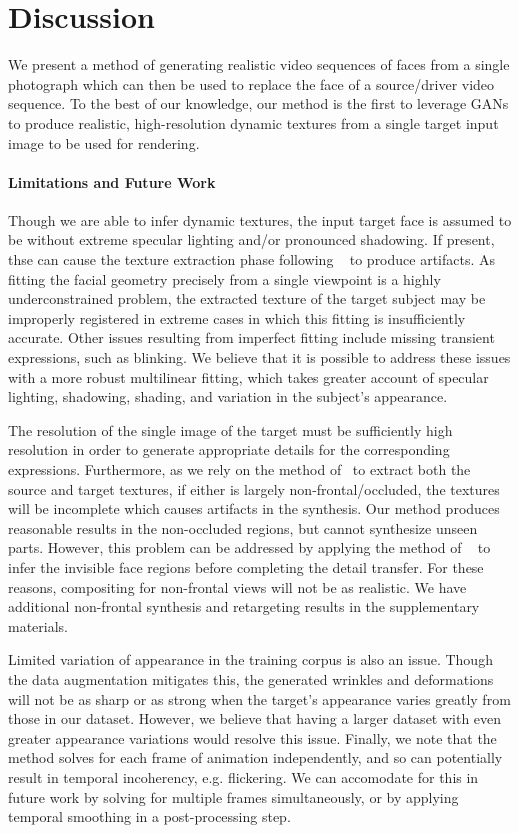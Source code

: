 
\section{Discussion}

We present a method of generating realistic video sequences of faces from a single photograph 
which can then be used to replace the face of a source/driver video sequence. 
To the best of our knowledge, our method is the first
to leverage GANs to produce realistic, high-resolution dynamic textures from a single target input image to be used for rendering.  

\paragraph{Limitations and Future Work}
Though we are able to infer dynamic textures, the input target face is assumed to be without extreme specular lighting and/or pronounced shadowing. If present, thse can cause the texture extraction phase following ~\cite{f2f} to produce artifacts. As fitting the facial geometry precisely from a single viewpoint is a highly underconstrained problem, the extracted texture of the target subject may be improperly registered in extreme cases in which this fitting is insufficiently accurate. Other issues resulting from imperfect fitting include missing transient expressions, such as blinking. We believe that it is possible to address these issues with a more robust multilinear fitting, which takes greater account of specular lighting, shadowing, shading, and variation in the subject's appearance.   

The resolution of the single image of the target must be sufficiently high resolution in order to generate appropriate details for the corresponding expressions. Furthermore, as we rely on the method of~\cite{f2f} to extract both the source and target textures, if either is largely non-frontal/occluded, the textures will be incomplete which causes artifacts in the synthesis.  Our method produces reasonable results in the non-occluded regions, but cannot synthesize unseen parts. However, this problem can be addressed by applying the method of ~\cite{saito2016} to infer the invisible face regions before completing the detail transfer.  For these reasons, compositing for non-frontal views will not be as realistic.  We have additional non-frontal synthesis and retargeting results in the supplementary materials.  


Limited variation of appearance in the training corpus is also an issue.  Though the data augmentation mitigates this, the generated wrinkles and deformations will not be as sharp or as strong when the target's appearance varies greatly from those in our dataset.  However, we believe that having a larger dataset with even greater appearance variations would resolve this issue. Finally, we note that the method solves for each frame of animation independently, and so can potentially result in temporal incoherency, e.g. flickering.  We can accomodate for this in future work by solving for multiple frames simultaneously, or by applying temporal smoothing in a post-processing step.  

\vfill\eject

